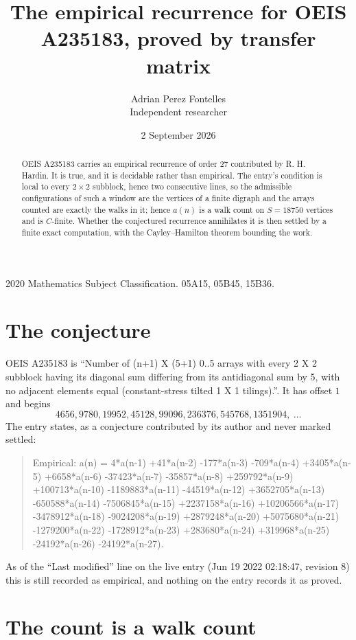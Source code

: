 \documentclass[11pt,a4paper]{article}
\title{The empirical recurrence for OEIS A235183, proved by transfer matrix}
\author{Adrian Perez Fontelles\\ \small Independent researcher}
\date{2 September 2026}
\theoremstyle{plain}
\theoremstyle{definition}
\begin{document}
\maketitle

\begin{abstract}
OEIS A235183 carries an empirical recurrence of order $27$ contributed by R. H. Hardin. It is
true, and it is decidable rather than empirical. The entry's condition is local to every $2\times2$ subblock, hence two consecutive lines, so
the admissible configurations of such a window are the vertices of a finite digraph and the
arrays counted are exactly the walks in it; hence $a(n)$ is a walk count on $S=18750$ vertices
and is $C$-finite. Whether the conjectured recurrence annihilates it is then settled by a
finite exact computation, with the Cayley--Hamilton theorem bounding the work.
\end{abstract}

\noindent\small 2020 Mathematics Subject Classification. 05A15, 05B45, 15B36.\normalsize

\section{The conjecture}

OEIS A235183 is ``Number of (n+1) X (5+1) 0..5 arrays with every 2 X 2 subblock having its diagonal sum differing from its antidiagonal sum by 5, with no adjacent elements equal (constant-stress tilted 1 X 1 tilings).''. It has offset $1$ and begins
\[
4656, 9780, 19952, 45128, 99096, 236376, 545768, 1351904,\ \dots
\]
The entry states, as a conjecture contributed by its author and never marked settled:
\begin{quote}
Empirical: a(n) = 4*a(n-1) +41*a(n-2) -177*a(n-3) -709*a(n-4) +3405*a(n-5) +6658*a(n-6) -37423*a(n-7) -35857*a(n-8) +259792*a(n-9) +100713*a(n-10) -1189883*a(n-11) -44519*a(n-12) +3652705*a(n-13) -650588*a(n-14) -7506845*a(n-15) +2237158*a(n-16) +10206566*a(n-17) -3478912*a(n-18) -9024208*a(n-19) +2879248*a(n-20) +5075680*a(n-21) -1279200*a(n-22) -1728912*a(n-23) +283680*a(n-24) +319968*a(n-25) -24192*a(n-26) -24192*a(n-27).
\end{quote}
As of the ``Last modified'' line on the live entry (Jun 19 2022 02:18:47, revision 8) this is still
recorded as empirical, and nothing on the entry records it as proved.

\section{The count is a walk count}
\end{document}
